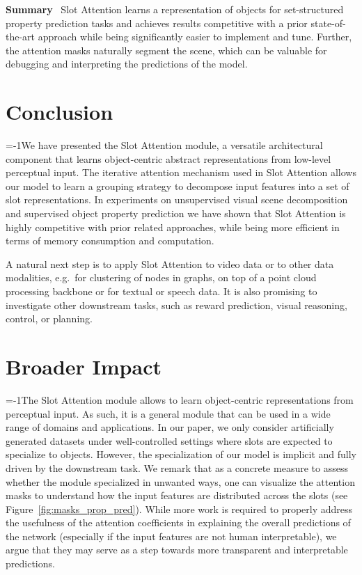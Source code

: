 \documentclass{article}
\newcommand{\sam}[0]{Slot Attention\xspace}
\begin{document}
\textbf{Summary} \ Slot Attention learns a representation of objects for set-structured property prediction tasks and achieves results competitive with a prior state-of-the-art approach while being significantly easier to implement and tune. Further, the attention masks naturally segment the scene, which can be valuable for debugging and interpreting the predictions of the model.

\section{Conclusion}\label{sec:conclusions}
\looseness=-1We have presented the Slot Attention module, a versatile architectural component that learns object-centric abstract representations from low-level perceptual input. The iterative attention mechanism used in Slot Attention allows our model to learn a grouping strategy to decompose input features into a set of slot representations. In experiments on unsupervised visual scene decomposition and supervised object property prediction we have shown that Slot Attention is highly competitive with prior related approaches, while being more efficient in terms of memory consumption and computation.

A natural next step is to apply \sam to video data or to other data modalities, e.g.~for clustering of nodes in graphs, on top of a point cloud processing backbone or for textual or speech data. It is also promising to investigate other downstream tasks, such as reward prediction, visual reasoning, control, or planning.

\section*{Broader Impact}
\looseness=-1The Slot Attention module allows to learn object-centric representations from perceptual input. As such, it is a general module that can be used in a wide range of domains and applications. In our paper, we only consider artificially generated datasets under well-controlled settings where slots are expected to specialize to objects. However, the specialization of our model is implicit and fully driven by the downstream task.
We remark that as a concrete measure to assess whether the module specialized in unwanted ways, one can visualize the attention masks to understand how the input features are distributed across the slots (see Figure~\ref{fig:masks_prop_pred}). While more work is required to properly address the usefulness of the attention coefficients in explaining the overall predictions of the network (especially if the input features are not human interpretable), we argue that they may serve as a step towards more transparent and interpretable predictions.
\end{document}
